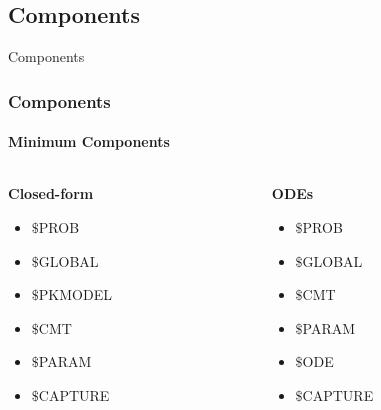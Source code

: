 \documentclass[
	11pt, %
]{beamer}
\begin{document}


\subsection{Components}
\begin{frame}[fragile]{Components}
	\frametitle{Components}
	\framesubtitle{Minimum Components} 
	\small
    \begin{columns}[c] 
		\begin{column}{0.5\textwidth} %
			\textbf{Closed-form}
			\small
			\begin{itemize}
        \item $\$$PROB			
        \item $\$$GLOBAL
        \item $\$$PKMODEL
        \item $\$$CMT
        \item $\$$PARAM
        \item $\$$CAPTURE
      \end{itemize}
		\end{column}
		\begin{column}{0.5\textwidth} %
	\textbf{ODEs}
			\begin{itemize}
        \item $\$$PROB		
        \item $\$$GLOBAL
        \item $\$$CMT
        \item $\$$PARAM
        \item $\$$ODE
        \item $\$$CAPTURE
      \end{itemize}
		\end{column}
	\end{columns}

	\end{frame}

\end{document}
